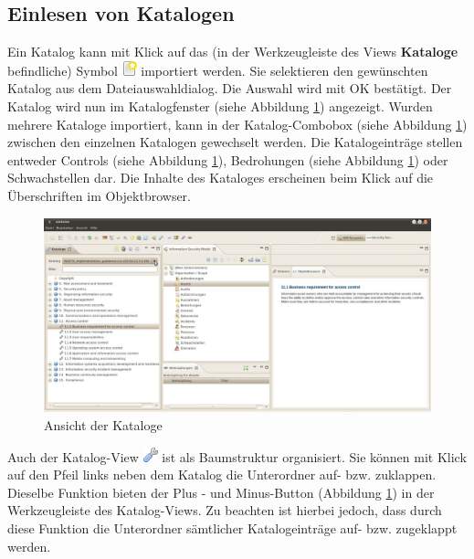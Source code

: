 \documentclass[a4paper,10pt]{book}
\begin{document}
\subsection{Einlesen von Katalogen}
Ein Katalog kann mit Klick auf das (in der Werkzeugleiste des Views
\textbf{Kataloge} befindliche) Symbol
\includegraphics[height=2ex]{Icon/Oeffnen.png} importiert werden. Sie
selektieren den gewünschten Katalog aus dem Dateiauswahldialog. Die Auswahl wird
mit OK bestätigt. Der Katalog wird nun im Katalogfenster (siehe Abbildung
\ref{Ansicht der Kataloge}) angezeigt. Wurden mehrere Kataloge importiert, kann
in der Katalog-Combobox (siehe Abbildung \ref{Ansicht der Kataloge}) zwischen
den einzelnen Katalogen gewechselt werden. Die Katalogeinträge stellen entweder
Controls (siehe Abbildung \ref{Ansicht der Kataloge}), Bedrohungen (siehe
Abbildung \ref{Ansicht der Kataloge}) oder Schwachstellen dar. Die Inhalte des
Kataloges erscheinen beim Klick auf die Überschriften im Objektbrowser.
\begin{figure}[htb!]
  \centering
  \includegraphics[scale=.25]{Screenshot/Kataloge_screenshot.jpg}
  \caption{\label{Ansicht der Kataloge} Ansicht der Kataloge}
\end{figure}
\newline
Auch der Katalog-View \includegraphics[height=2ex]{Icon/Control_Kataloge.png} ist als Baumstruktur organisiert. Sie können mit Klick auf den Pfeil links neben dem Katalog die
Unterordner auf- bzw. zuklappen. Dieselbe Funktion bieten der Plus - und Minus-Button (Abbildung \ref{Ansicht der Kataloge}) in der Werkzeugleiste des Katalog-Views.
Zu beachten ist hierbei jedoch, dass durch diese Funktion die Unterordner sämtlicher Katalogeinträge auf- bzw. zugeklappt werden.
\end{document}

